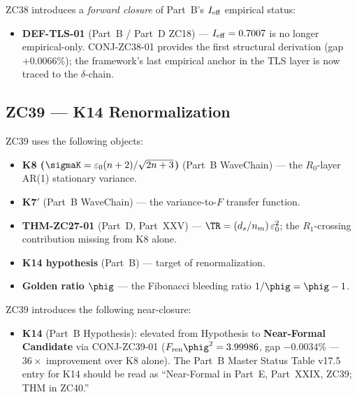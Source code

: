 \documentclass[12pt, a4paper]{article}
\begin{document}
\begin{correctionbox}
ZC38 introduces a \emph{forward closure} of Part~B's $I_{\rm eff}$
empirical status:
\begin{itemize}[noitemsep,leftmargin=1.5em]
  \item \textbf{DEF-TLS-01} (Part~B / Part~D ZC18) ---
    $I_{\rm eff} = 0.7007$ is no longer empirical-only.
    CONJ-ZC38-01 provides the first structural derivation
    (gap $+0.0066\%$); the framework's last empirical anchor in
    the TLS layer is now traced to the $\delta$-chain.
\end{itemize}
\end{correctionbox}

\bigskip

\subsection{ZC39 --- K14 Renormalization}
\label{cmap:zc39}

\begin{inheritbox}
ZC39 uses the following objects:
\begin{itemize}[noitemsep,leftmargin=1.5em]
  \item \textbf{K8 ($\sigmaK = \varepsilon_0(n+2)/\sqrt{2n+3}$)}
    (Part~B WaveChain) --- the $R_0$-layer AR(1) stationary variance.
  \item \textbf{K7$'$} (Part~B WaveChain) --- the variance-to-$F$
    transfer function.
  \item \textbf{THM-ZC27-01} (Part~D, Part~XXV) ---
    $\TR = (d_s/n_m)\,\varepsilon_0^2$; the $R_1$-crossing
    contribution missing from K8 alone.
  \item \textbf{K14 hypothesis} (Part~B) --- target of renormalization.
  \item \textbf{Golden ratio $\phig$} --- the Fibonacci bleeding ratio
    $1/\phig = \phig - 1$.
\end{itemize}
\end{inheritbox}

\begin{correctionbox}
ZC39 introduces the following near-closure:
\begin{itemize}[noitemsep,leftmargin=1.5em]
  \item \textbf{K14} (Part~B Hypothesis): elevated from Hypothesis
    to \textbf{Near-Formal Candidate} via CONJ-ZC39-01
    ($F_{\rm ren}\phig^2 = 3.99986$, gap $-0.0034\%$ ---
    $36\times$ improvement over K8 alone). The Part~B Master Status
    Table v17.5 entry for K14 should be read as ``Near-Formal in
    Part~E, Part~XXIX, ZC39; THM in ZC40.''
\end{itemize}
\end{correctionbox}
\end{document}
